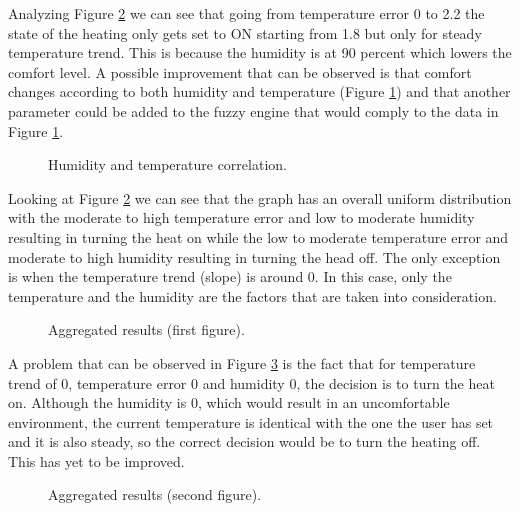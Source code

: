 \documentclass[conference]{IEEEtran}
\begin{document}
Analyzing Figure \ref{fig:result1} we can see that going from temperature error 0 to 2.2
the state of the heating only gets set to ON starting from 1.8 but only for steady temperature trend. This is
because the humidity is at 90 percent which lowers the comfort level. A possible improvement that can be
observed is that comfort changes according to both humidity and temperature (Figure \ref{fig:humidex}) and
that another parameter could be added to the fuzzy engine that would comply to the data in Figure
\ref{fig:humidex}.

\begin{figure}[h!]
\label{fig:humidex}
\centerline{}
      \caption[Humidity and temperature correlation]{Humidity and temperature correlation.}
\label{fig:humidex}
\end{figure}

Looking at Figure \ref{fig:result1} we can see that the graph has an overall uniform distribution with the
moderate to high temperature error and low to moderate humidity resulting in turning the heat on while
the low to moderate temperature error and moderate to high humidity resulting in turning the head off.
The only exception is when the temperature trend (slope) is around 0. In this case, only the temperature and
the humidity are the factors that are taken into consideration.

\begin{figure}[h!]
\label{fig:result1}
\centerline{}
      \caption[Aggregated results (first figure).]{Aggregated results (first figure).}
\label{fig:result1}
\end{figure}

A problem that can be observed in Figure \ref{fig:result2} is the fact that for temperature trend of 0,
temperature error 0 and humidity 0, the decision is to turn the heat on. Although the humidity is 0, which
would result in an uncomfortable environment, the current temperature is identical with the one the user has
set and it is also steady, so the correct decision would be to turn the heating off. This has yet to be
improved.

\begin{figure}[h!]
\label{fig:result2}
\centerline{}
      \caption[Aggregated results (second figure).]{Aggregated results (second figure).}
\label{fig:result2}
\end{figure}
\end{document}
